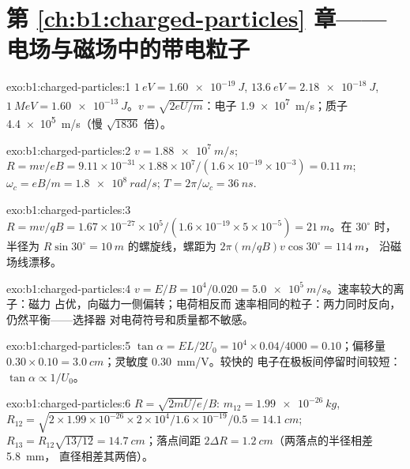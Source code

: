 \section*{第 \ref{ch:b1:charged-particles} 章——电场与磁场中的带电粒子}

\begin{solution}{exo:b1:charged-particles:1}
$\qty{1}{eV} = \qty{1.60e-19}{J}$, $\qty{13.6}{eV} = \qty{2.18e-18}{J}$,
$\qty{1}{MeV} = \qty{1.60e-13}{J}$。$v = \sqrt{2eU/m}$：电子
\qty{1.9e7}{m/s}；质子 \qty{4.4e5}{m/s}（慢 $\sqrt{1836}$ 倍）。
\end{solution}

\begin{solution}{exo:b1:charged-particles:2}
$v = \qty{1.88e7}{m/s}$; $R = mv/eB = 9.11\times10^{-31} \times 1.88\times10^7/
(1.6\times10^{-19} \times 10^{-3}) = \qty{0.11}{m}$; $\omega_c = eB/m =
\qty{1.8e8}{rad/s}$; $T = 2\pi/\omega_c = \qty{36}{ns}$.
\end{solution}

\begin{solution}{exo:b1:charged-particles:3}
$R = mv/qB = 1.67\times10^{-27} \times 10^5/(1.6\times10^{-19} \times 5\times
10^{-5}) = \qty{21}{m}$。在 $30^\circ$ 时，半径为 $R\sin 30^\circ
= \qty{10}{m}$ 的螺旋线，螺距为 $2\pi(m/qB)v\cos 30^\circ = \qty{114}{m}$，
沿磁场线漂移。
\end{solution}

\begin{solution}{exo:b1:charged-particles:4}
$v = E/B = 10^4/0.020 = \qty{5.0e5}{m/s}$。速率较大的离子：磁力
占优，向磁力一侧偏转；电荷相反而
速率相同的粒子：两力同时反向，仍然平衡——选择器
对电荷符号和质量都不敏感。
\end{solution}

\begin{solution}{exo:b1:charged-particles:5}
$\tan\alpha = EL/2U_0 = 10^4 \times 0.04/4000 = 0.10$；偏移量
$0.30 \times 0.10 = \qty{3.0}{cm}$；灵敏度 \qty{0.30}{mm/V}。较快的
电子在极板间停留时间较短：$\tan\alpha \propto 1/U_0$。
\end{solution}

\begin{solution}{exo:b1:charged-particles:6}
$R = \sqrt{2mU/e}/B$: $m_{12} = \qty{1.99e-26}{kg}$, $R_{12} = \sqrt{2 \times
1.99\times10^{-26} \times 2\times10^4/1.6\times10^{-19}}/0.5 = \qty{14.1}{cm}$;
$R_{13} = R_{12}\sqrt{13/12} = \qty{14.7}{cm}$；落点间距 $2\Delta R =
\qty{1.2}{cm}$（两落点的半径相差 \qty{5.8}{mm}，
直径相差其两倍）。
\end{solution}

